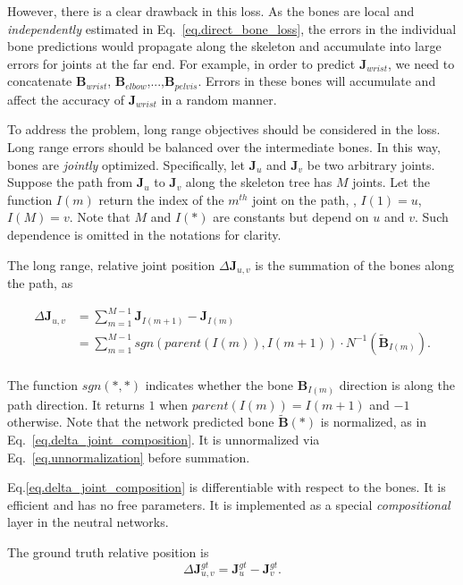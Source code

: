 \documentclass[10pt,twocolumn,letterpaper]{article}
\begin{document}
However, there is a clear drawback in this loss. As the bones are local and \emph{independently} estimated in Eq.~\eqref{eq.direct_bone_loss}, the errors in the individual bone predictions would propagate along the skeleton and accumulate into large errors for joints at the far end. For example, in order to predict $\mathbf{J}_{wrist}$, we need to concatenate $\mathbf{B}_{wrist}$, $\mathbf{B}_{elbow}$,...,$\mathbf{B}_{pelvis}$. Errors in these bones will accumulate and affect the accuracy of $\mathbf{J}_{wrist}$ in a random manner.

To address the problem, long range objectives should be considered in the loss. Long range errors should be balanced over the intermediate bones. In this way, bones are \emph{jointly} optimized. Specifically, let $\mathbf{J}_u$ and $\mathbf{J}_v$ be two arbitrary joints. Suppose the path from $\mathbf{J}_u$ to $\mathbf{J}_v$ along the skeleton tree has $M$ joints. Let the function $I(m)$ return the index of the $m^{th}$ joint on the path, \eg, $I(1)=u$, $I(M)=v$. Note that $M$ and $I(*)$ are constants but depend on $u$ and $v$. Such dependence is omitted in the notations for clarity.

The long range, relative joint position $\Delta\mathbf{J}_{u,v}$ is the summation of the bones along the path, as

\begin{equation}
\begin{split}
\Delta\mathbf{J}_{u,v} &  = \sum_{m = 1}^{M-1} \mathbf{J}_{I(m+1)} - \mathbf{J}_{I(m)}\\
   & =\sum_{m=1}^{M-1}sgn(parent(I(m)),I(m+1))\cdot N^{-1}(\tilde{\mathbf{B}}_{I(m)}).\\
\end{split}
\label{eq.delta_joint_composition}
\end{equation}

The function $sgn(*,*)$ indicates whether the bone $\mathbf{B}_{I(m)}$ direction is along the path direction. It returns $1$ when $parent(I(m))=I(m+1)$ and $-1$ otherwise. 
Note that the network predicted bone $\tilde{\mathbf{B}}(*)$ is normalized, as in Eq.~\eqref{eq.delta_joint_composition}. It is unnormalized via Eq.~\eqref{eq.unnormalization} before summation.

Eq.\eqref{eq.delta_joint_composition} is differentiable with respect to the bones. It is efficient and has no free parameters. It is implemented as a special \emph{compositional} layer in the neutral networks.

The ground truth relative position is
\begin{equation}
\Delta\mathbf{J}_{u,v}^{gt} = \mathbf{J}_u^{gt} - \mathbf{J}_v^{gt}.
\end{equation}
\end{document}
